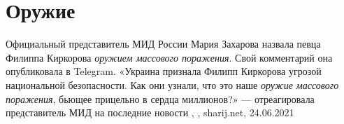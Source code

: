  
 
 
 
 
\chapter{Оружие}

Официальный представитель МИД России Мария Захарова назвала певца Филиппа
Киркорова \emph{оружием массового поражения}. Свой комментарий она опубликовала в
Telegram.  «Украина признала Филипп Киркорова угрозой национальной
безопасности. Как они узнали, что это наше \emph{оружие массового поражения}, бьющее
прицельно в сердца миллионов?» — отреагировала представитель МИД на последние
новости
, , sharij.net, 24.06.2021
